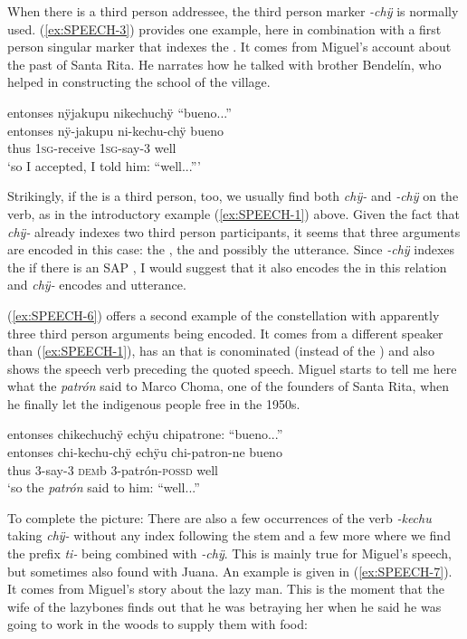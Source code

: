 When there is a third person addressee, the third person marker \textit{-chÿ} is normally used. (\ref{ex:SPEECH-3}) provides one example, here in combination with a first person singular marker that indexes the . It comes from Miguel’s account about the past of Santa Rita. He narrates how he talked with brother Bendelín, who helped in constructing the school of the village.

\ea\label{ex:SPEECH-3}
\begingl
\glpreamble entonses nÿjakupu nikechuchÿ “bueno...”\\
\gla entonses nÿ-jakupu ni-kechu-chÿ bueno\\
\glb thus 1\textsc{sg}-receive 1\textsc{sg}-say-3 well\\
\glft ‘so I accepted, I told him: “well...”’
\endgl
\trailingcitation{[mxx-p110825l.113]}
\xe

Strikingly, if the  is a third person, too, we usually find both \textit{chÿ-} and \textit{-chÿ} on the verb, as in the introductory example (\ref{ex:SPEECH-1}) above. Given the fact that \textit{chÿ-} already indexes two third person participants, it seems that three arguments are encoded in this case: the , the  and possibly the utterance. Since \textit{-chÿ} indexes the  if there is an SAP , I would suggest that it also encodes the  in this relation and \textit{chÿ-} encodes  and utterance.

(\ref{ex:SPEECH-6}) offers a second example of the constellation with apparently three third person arguments being encoded. It comes from a different speaker than (\ref{ex:SPEECH-1}), has an  that is conominated (instead of the ) and also shows the speech verb preceding the quoted speech. Miguel starts to tell me here what the \textit{patrón} said to Marco Choma, one of the founders of Santa Rita, when he finally let the indigenous people free in the 1950s.

\ea\label{ex:SPEECH-6}
\begingl
\glpreamble entonses chikechuchÿ echÿu chipatrone: “bueno...”\\
\gla entonses chi-kechu-chÿ echÿu chi-patron-ne bueno\\
\glb thus 3-say-3 \textsc{dem}b 3-patrón-\textsc{possd} well\\
\glft ‘so the \textit{patrón} said to him: “well...”
\endgl
\trailingcitation{[mxx-p110825l.026]}
\xe

To complete the picture: There are also a few occurrences of the verb \textit{-kechu} taking \textit{chÿ-} without any index following the stem and a few more where we find the prefix \textit{ti-} being combined with \textit{-chÿ}. This is mainly true for Miguel’s speech, but sometimes also found with Juana. An example is given in (\ref{ex:SPEECH-7}). It comes from Miguel’s story about the lazy man. This is the moment that the wife of the lazybones finds out that he was betraying her when he said he was going to work in the woods to supply them with food:

